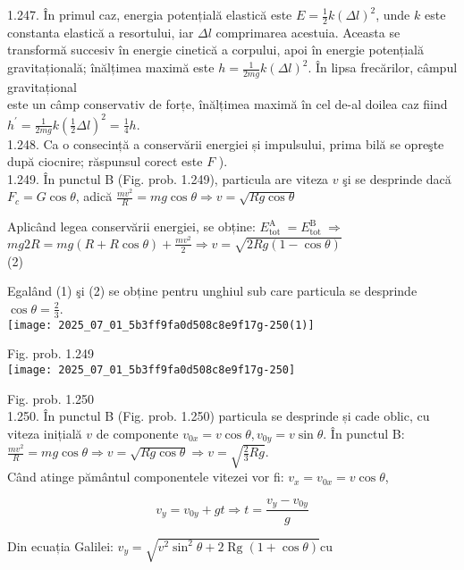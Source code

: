 1.247. În primul caz, energia potențială elastică este $E=\frac{1}{2} k(\Delta l)^{2}$, unde $k$ este constanta elastică a resortului, iar $\Delta l$ comprimarea acestuia. Aceasta se transformă succesiv în energie cinetică a corpului, apoi în energie potențială gravitațională; înălțimea maximă este $h=\frac{1}{2 m g} k(\Delta l)^{2}$. În lipsa frecărilor, câmpul gravitațional\\
este un câmp conservativ de forțe, înălțimea maximă în cel de-al doilea caz fiind $h^{\prime}=\frac{1}{2 m g} k\left(\frac{1}{2} \Delta l\right)^{2}=\frac{1}{4} h$.\\
1.248. Ca o consecință a conservării energiei și impulsului, prima bilă se opreşte după ciocnire; răspunsul corect este $F$ ).\\
1.249. În punctul B (Fig. prob. 1.249), particula are viteza $v$ şi se desprinde dacă $F_{c}=G \cos \theta$, adică $\frac{m v^{2}}{R}=m g \cos \theta \Rightarrow v=\sqrt{R g \cos \theta}$

Aplicând legea conservării energiei, se obține: $E_{\text {tot }}^{\mathrm{A}}=E_{\text {tot }}^{\mathrm{B}} \Rightarrow$\\
$m g 2 R=m g(R+R \cos \theta)+\frac{m v^{2}}{2} \Rightarrow v=\sqrt{2 R g(1-\cos \theta)}$\\
(2)

Egalând (1) şi (2) se obține pentru unghiul sub care particula se desprinde $\cos \theta=\frac{2}{3}$.\\
\texttt{[image: 2025\_07\_01\_5b3ff9fa0d508c8e9f17g-250(1)]}

Fig. prob. 1.249\\
\texttt{[image: 2025\_07\_01\_5b3ff9fa0d508c8e9f17g-250]}

Fig. prob. 1.250\\
1.250. În punctul B (Fig. prob. 1.250) particula se desprinde și cade oblic, cu viteza inițială $v$ de componente $v_{0 x}=v \cos \theta, v_{0 y}=v \sin \theta$. În punctul B: $\frac{m v^{2}}{R}=m g \cos \theta \Rightarrow v=\sqrt{R g \cos \theta} \Rightarrow v=\sqrt{\frac{2}{3} R g}$.\\
Când atinge pământul componentele vitezei vor fi: $v_{x}=v_{0 x}=v \cos \theta$,


\begin{equation*}
v_{y}=v_{0 y}+g t \Rightarrow t=\frac{v_{y}-v_{0 y}}{g} \tag{1}
\end{equation*}


Din ecuația Galilei: $v_{y}=\sqrt{v^{2} \sin ^{2} \theta+2 \operatorname{Rg}(1+\cos \theta)} \mathrm{cu}$

